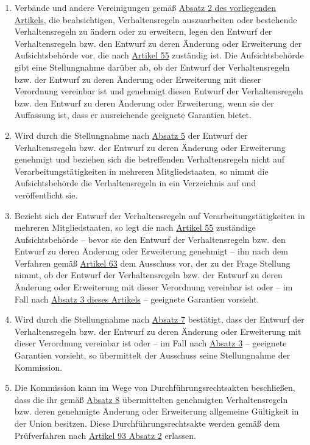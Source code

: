 \begin{enumerate}
  \item Verbände und andere Vereinigungen gemäß \hyperref[itm:40-2]{Absatz 2 des vorliegenden Artikels}, die
   beabsichtigen, Verhaltensregeln auszuarbeiten oder bestehende Verhaltensregeln zu ändern oder zu erweitern, legen
   den Entwurf der Verhaltensregeln bzw. den Entwurf zu deren Änderung oder Erweiterung der Aufsichtsbehörde vor, die
   nach \hyperref[ch:55]{Artikel 55} zuständig ist. Die Aufsichtsbehörde gibt eine Stellungnahme darüber ab, ob der
   Entwurf der Verhaltensregeln bzw. der Entwurf zu deren Änderung oder Erweiterung mit dieser Verordnung vereinbar ist
   und genehmigt diesen Entwurf der Verhaltensregeln bzw. den Entwurf zu deren Änderung oder Erweiterung, wenn sie der
   Auffassung ist, dass er ausreichende geeignete Garantien bietet.
  \label{itm:40-5}

  \item Wird durch die Stellungnahme nach \hyperref[itm:40-5]{Absatz 5} der Entwurf der Verhaltensregeln bzw. der
   Entwurf zu deren Änderung oder Erweiterung genehmigt und beziehen sich die betreffenden Verhaltensregeln nicht auf
   Verarbeitungstätigkeiten in mehreren Mitgliedstaaten, so nimmt die Aufsichtsbehörde die Verhaltensregeln in ein
   Verzeichnis auf und veröffentlicht sie.
  \label{itm:40-6}

  \item Bezieht sich der Entwurf der Verhaltensregeln auf Verarbeitungstätigkeiten in mehreren Mitgliedstaaten, so legt
   die nach \hyperref[ch:55]{Artikel 55} zuständige Aufsichtsbehörde -- bevor sie den Entwurf der Verhaltensregeln bzw.
   den Entwurf zu deren Änderung oder Erweiterung genehmigt -- ihn nach dem Verfahren gemäß \hyperref[ch:63]
   {Artikel 63} dem Ausschuss vor, der zu der Frage Stellung nimmt, ob der Entwurf der Verhaltensregeln bzw. der
   Entwurf zu deren Änderung oder Erweiterung mit dieser Verordnung vereinbar ist oder -- im Fall nach \hyperref
   [itm:40-3]{Absatz 3 dieses Artikels} -- geeignete Garantien vorsieht.
  \label{itm:40-7}

  \item Wird durch die Stellungnahme nach \hyperref[itm:40-3]{Absatz 7} bestätigt, dass der Entwurf der Verhaltensregeln
   bzw. der Entwurf zu deren Änderung oder Erweiterung mit dieser Verordnung vereinbar ist oder -- im Fall
   nach \hyperref[itm:40-3]{Absatz 3} -- geeignete Garantien vorsieht, so übermittelt der Ausschuss seine Stellungnahme
   der Kommission.
  \label{itm:40-8}

  \item Die Kommission kann im Wege von Durchführungsrechtsakten beschließen, dass die ihr gemäß \hyperref[itm:40-8]
   {Absatz 8} übermittelten genehmigten Verhaltensregeln bzw. deren genehmigte Änderung oder Erweiterung allgemeine
   Gültigkeit in der Union besitzen. Diese Durchführungsrechtsakte werden gemäß dem Prüfverfahren nach \hyperref
   [itm:93-2]{Artikel 93 Absatz 2} erlassen.
  \label{itm:40-9}


\end{enumerate}
